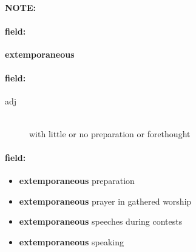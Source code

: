 \documentclass[12pt]{article}
\newenvironment{note}{\paragraph{NOTE:}}{}
\newenvironment{field}{\paragraph{field:}}{}
\begin{document}
\begin{note}
\begin{field}
\textbf{\large extemporaneous}
\end{field}


\begin{field}
\begin{description}
\item[adj] \hfill \\ 
with little or no preparation or forethought

\end{description}
\end{field}

\begin{field}
\begin{itemize}
\item \textbf{extemporaneous} preparation
\item \textbf{extemporaneous} prayer in gathered worship
\item \textbf{extemporaneous} speeches during contests
\item \textbf{extemporaneous} speaking
\end{itemize}
\end{field}
\end{note}
\end{document}
